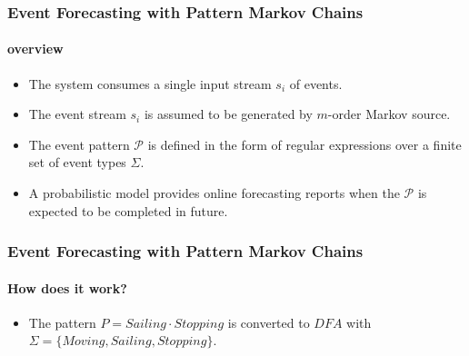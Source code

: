 \frame
{
  \frametitle{ Event Forecasting with Pattern Markov
 	Chains \cite{alevizos2017event} }
	\framesubtitle{overview}
  \begin{itemize}[]
  	\item<1-> The system consumes a single input stream $s_i$ of events.
  	\item<1-> The event stream $s_i$ is assumed to be generated by $m$-order Markov source.
  \item<1-> The  event pattern $\mathcal{P}$ is defined in the form of regular expressions over a finite set of event types $\Sigma$.

  \item<1-> A probabilistic model provides online forecasting reports when the $\mathcal{P}$ is expected to be completed in future. 
   
  \end{itemize}
}

\frame
{
	\frametitle{Event Forecasting with Pattern Markov
		Chains  }
	\framesubtitle{ How does it work?}
		\begin{itemize}
		\item<only@1> The pattern $P=Sailing\cdot Stopping$ is converted to $DFA$ with $\Sigma=\{Moving,Sailing,Stopping\}$. 
		
	
			\end{itemize}
}


